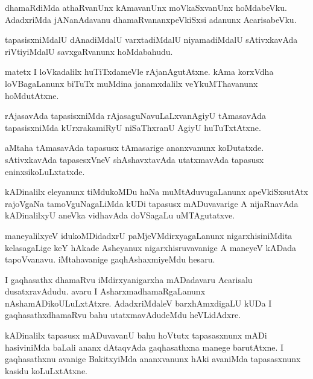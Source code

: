 \documentclass{article}
\begin{document}
\begin{mn}%
dhamaRdiMda athaRvanUnx kAmavanUnx moVkaSxvanUnx hoMdabeVku. AdadxriMda jANanAdavanu 
dhamaRvananxpeVkiSxsi adanunx AcarisabeVku.
\end{mn}

\begin{mn}%
tapasisxniMdalU dAnadiMdalU varxtadiMdalU niyamadiMdalU sAtivxkavAda riVtiyiMdalU savxgaRvanunx 
hoMdabahudu.
\end{mn}

\begin{mn}%
matetx I loVkadalilx huTiTxdameVle rAjanAgutAtxne. kAma korxVdha loVBagaLanunx biTuTx muMdina 
janamxdalilx veYkuMThavanunx hoMdutAtxne.
\end{mn}

\begin{mn}%
rAjasavAda tapasisxniMda rAjasaguNavuLaLxvanAgiyU tAmasavAda tapasisxniMda kUrxrakamiRyU 
niSaThxranU AgiyU huTuTxtAtxne.
\end{mn}

\begin{mn}%
aMtaha tAmasavAda tapasusx tAmasarige ananxvanunx koDutatxde. sAtivxkavAda tapasesxVneV 
shAshavxtavAda utatxmavAda tapasusx eninxsikoLuLxtatxde.
\end{mn}

\begin{mn}%
kADinalilx eleyanunx tiMdukoMDu haNa muMtAduvugaLanunx apeVkiSxsutAtx rajoVgaNa tamoVguNagaLiMda 
kUDi tapasusx mADuvavarige A nijaRnavAda kADinalilxyU aneVka vidhavAda doVSagaLu uMTAgutatxve.
\end{mn}

\begin{mn}%
maneyalilxyeV idukoMDidadxrU paMjeVMdirxyagaLanunx nigarxhisiniMdita kelasagaLige keY hAkade 
Asheyanux nigarxhisruvavanige A maneyeV kADada tapoVvanavu. iMtahavanige gaqhAshaxmiyeMdu hesaru.
\end{mn}

\begin{mn}%
I gaqhasathx dhamaRvu iMdirxyanigarxha mADadavaru Acarisalu dusatxravAdudu. avaru I 
AsharxmadhamaRgaLanunx nAshamADikoULuLxtAtxre. AdadxriMdaleV barxhAmxdigaLU kUDa I 
gaqhasathxdhamaRvu bahu utatxmavAdudeMdu heVLidAdxre.
\end{mn}

\begin{mn}%
kADinalilx tapasusx mADuvavanU bahu hoVtutx tapasasxnunx mADi hasiviniMda baLali ananx dAtaqvAda 
gaqhasathxna manege barutAtxne. I gaqhasathxnu avanige BakitxyiMda ananxvanunx hAki avaniMda 
tapasasxnunx kasidu koLuLxtAtxne.
\end{mn}
\end{document}
